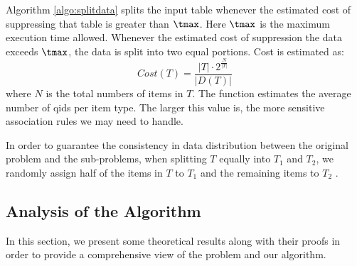 Algorithm \ref{algo:splitdata}
splits the input table whenever the estimated cost of
suppressing that table is greater than $\tmax$.
Here $\tmax$ is the maximum execution time allowed.
Whenever the estimated cost of suppression the data exceeds
$\tmax$, the data is split into two equal portions.
Cost is estimated as:
\begin{equation}\label{eq:costfunc}
Cost(T)=\frac{|T| \cdot 2^\frac{N}{|T|}}{|D(T)|} 
\end{equation}
where $N$ is the total numbers of items in $T$. 
The function estimates the average number of qids per item type. 
The larger this value is, the more sensitive association rules
we may need to handle.

In order to guarantee the consistency in data distribution between the 
original problem and the sub-problems, when splitting $T$ equally 
into $T_1$ and $T_2$, we randomly assign half of the items in 
$T$ to $T_1$ and the remaining items to $T_2$ .

\subsection{Analysis of the Algorithm}
\label{sec:analysis}

%
In this section, we present some theoretical results along with their proofs
in order to provide a comprehensive view of the problem and our algorithm.

